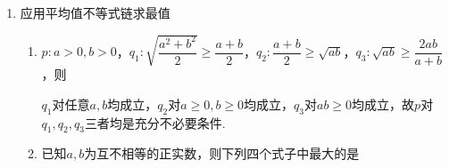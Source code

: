 \begin{enumerate}
\begin{enumerate}
\begin{jieda}
\begin{enumerate}
                首先对题目中的等式进行变换，等式两边同时除以$xy$得到$\dfrac{2}{x} + \dfrac{4}{y} = 1$，所以有$(2x+y) = (2x+y)(\dfrac{2}{x} + \dfrac{4}{y}) = \dfrac{8x}{y} + \dfrac{2y}{x} + 8 \geq 2\sqrt{\dfrac{8x}{y} \cdot \dfrac{2y}{x}} + 8 = 16$
            \end{enumerate}
        \end{jieda}
        \item 已知$a > 0, b > 0$，且$ab = 1$，则$\dfrac{1}{2a} + \dfrac{1}{2b} + \dfrac{8}{a+b}$的最小值为.
        \begin{jieda}
            \begin{enumerate}
                \item 消元法 \\
                用$a$表示$b$有$b = \dfrac{1}{a}$。原式可以化为$\dfrac{a}{2} + \dfrac{1}{2a} + \dfrac{8}{\dfrac{1}{a} + a} = \dfrac{1+a^2}{2a} + \dfrac{8a}{1+a^2} \geq 2\sqrt{\dfrac{1+a^2}{2a} \cdot \dfrac{8a}{1+a^2}} = 4$，当且仅当$a+b = a + \dfrac{1}{a} = 4$时取等号。 
                \item 常数法 \\
                原式$=(\dfrac{1}{2a} + \dfrac{1}{2b}) \times ab + \dfrac{8}{a+b} = \dfrac{a+b}{2} + \dfrac{8}{a+b} \geq 2\sqrt{\dfrac{a+b}{2} \cdot \dfrac{8}{a+b}} = 4$，当且仅当$\dfrac{a+b}{2} = \dfrac{8}{a+b}$，即$a+b=4$时取等号。
            \end{enumerate}
            \ps 容易出现的错解：消元后分别利用均值不等式得到答案5。\textbf{应用多次平均值不等式时应注意不等式方向是否相同，取等条件是否一致。}
        \end{jieda}
    \end{enumerate}
    \item 应用平均值不等式链求最值
    \begin{enumerate}
        \item $p: a>0, b>0$，$q_1:\sqrt{\dfrac{a^2+b^2}{2}} \geq \dfrac{a+b}{2}$，$q_2:\dfrac{a+b}{2} \geq \sqrt{ab}$，$q_3:\sqrt{ab} \geq \dfrac{2ab}{a+b}$，则
        \begin{jieda}
            $q_1$对任意$a, b$均成立，$q_2$对$a \geq 0, b \geq 0$均成立，$q_3$对$ab \geq 0$均成立，故$p$对$q_1, q_2, q_3$三者均是充分不必要条件.
        \end{jieda}
        \item 已知$a,b$为互不相等的正实数，则下列四个式子中最大的是 

\end{enumerate}
\end{enumerate}
